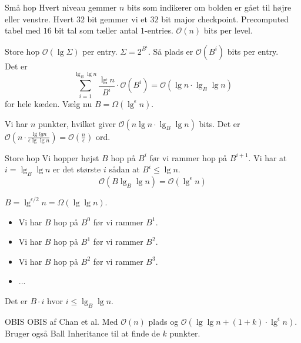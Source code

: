 \documentclass[pdf]{beamer}
\begin{document}
\begin{frame}{Små hop}
  Hvert niveau gemmer $n$ bits som indikerer om bolden er gået til højre eller venstre. Hvert $32$ bit gemmer vi et $32$ bit major checkpoint. Precomputed tabel med $16$ bit tal som tæller antal $1$-entries. $\mathcal{O}(n)$ bits per level.
\end{frame}

\begin{frame}{Store hop}
  $\mathcal{O}(\lg \Sigma)$ per entry. $\Sigma = 2^{B^i}$. Så plads er $\mathcal{O}(B^i)$ bits per entry.\\

  Det er $$\sum_{i=1}^{\lg_B \lg n} \frac{\lg n}{B^i}\cdot\mathcal{O}(B^i) = \mathcal{O}(\lg n \cdot \lg_B \lg n)$$ for hele kæden. Vælg nu $B = \Omega(\lg^\epsilon n)$.


  Vi har $n$ punkter, hvilket giver $\mathcal{O}(n\lg n \cdot\lg_B \lg n)$ bits. Det er $\mathcal{O}(n\cdot\frac{\lg lg n}{\epsilon \lg \lg n}) = \mathcal{O}(\frac{n}{\epsilon})$ ord.
\end{frame}


\begin{frame}{Store hop}
  Vi hopper højst $B$ hop på $B^i$ før vi rammer hop på $B^{i+1}$. Vi har at $i = \lg_B \lg n$ er det største $i$ sådan at $B^i \leq \lg n$. \\

  $$\mathcal{O}(B \lg_B \lg n) = \mathcal{O}(\lg^\epsilon n)$$


   $B = \lg^{\epsilon / 2} n = \Omega(\lg \lg n)$.
\end{frame}

\begin{frame}
  \begin{itemize}
    \item Vi har $B$ hop på $B^0$ før vi rammer $B^1$.
    \item Vi har $B$ hop på $B^1$ før vi rammer $B^2$.
    \item Vi har $B$ hop på $B^2$ før vi rammer $B^3$.
    \item ...
  \end{itemize}
  Det er $B \cdot i$ hvor $i \leq \lg_B \lg n$.
\end{frame}


\begin{frame}{OBIS}
  OBIS af Chan et al. Med $\mathcal{O}(n)$ plads og $\mathcal{O}(\lg \lg n + (1+k)\cdot\lg^\epsilon n)$. Bruger også Ball Inheritance til at finde de $k$ punkter.
\end{frame}
\end{document}
